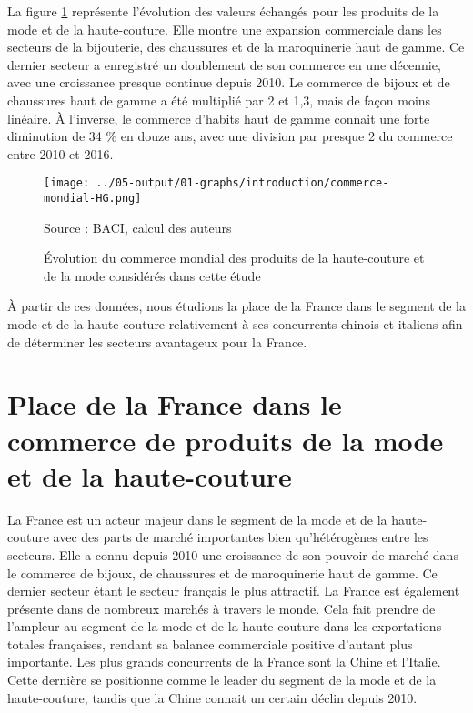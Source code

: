 \documentclass[french,10pt,a4paper]{article}
\begin{document}
\bigskip

La figure \ref{fig:commerce-mondial-HG} représente l'évolution des valeurs échangés pour les produits de la mode et de la haute-couture. Elle montre une expansion commerciale dans les secteurs de la bijouterie, des chaussures et de la maroquinerie haut de gamme. Ce dernier secteur a enregistré un doublement de son commerce en une décennie, avec une croissance presque continue depuis 2010. Le commerce de bijoux et de chaussures haut de gamme a été multiplié par 2 et 1,3, mais de façon moins linéaire. À l'inverse, le commerce d'habits haut de gamme connait une forte diminution de 34 \% en douze ans, avec une division par presque 2 du commerce entre 2010 et 2016.

\begin{figure}[!h]
  \centering
  \texttt{[image: ../05-output/01-graphs/introduction/commerce-mondial-HG.png]}
  \captionsetup{justification=raggedright,singlelinecheck=false, font=small}
  \caption*{Source : BACI, calcul des auteurs}
  \captionsetup{justification=centering, singlelinecheck=true, font=normalsize}
  \caption{Évolution du commerce mondial des produits de la haute-couture et de la mode considérés dans cette étude}
  \label{fig:commerce-mondial-HG}
\end{figure}

\bigskip

À partir de ces données, nous étudions la place de la France dans le segment de la mode et de la haute-couture relativement à ses concurrents chinois et italiens afin de déterminer les secteurs avantageux pour la France.

\section{Place de la France dans le commerce de produits de la mode et de la haute-couture}

La France est un acteur majeur dans le segment de la mode et de la haute-couture avec des parts de marché importantes bien qu'hétérogènes entre les secteurs. Elle a connu depuis 2010 une croissance de son pouvoir de marché dans le commerce de bijoux, de chaussures et de maroquinerie haut de gamme. Ce dernier secteur étant le secteur français le plus attractif. La France est également présente dans de nombreux marchés à travers le monde. Cela fait prendre de l'ampleur au segment de la mode et de la haute-couture dans les exportations totales françaises, rendant sa balance commerciale positive d'autant plus importante. Les plus grands concurrents de la France sont la Chine et l'Italie. Cette dernière se positionne comme le leader du segment de la mode et de la haute-couture, tandis que la Chine connait un certain déclin depuis 2010.
\end{document}
